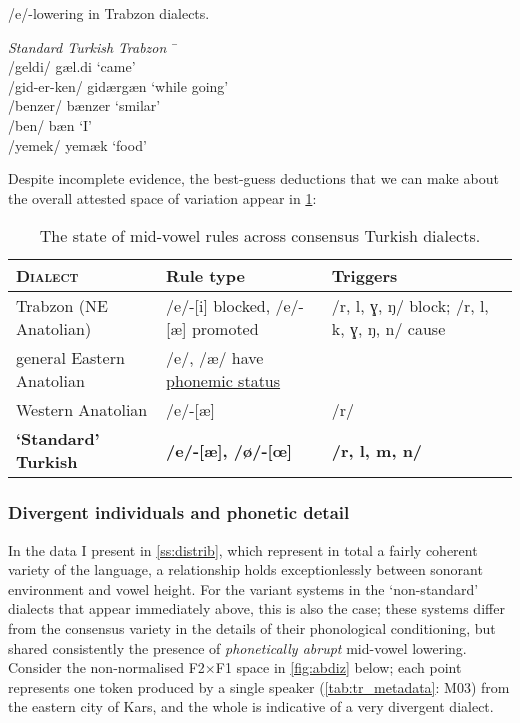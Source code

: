 \begin{example}\label{ex:trabzon2} /e/-lowering in Trabzon dialects.
\begin{tabbing}
  \textit{Standard Turkish} \tab[2cm] \= \textit{Trabzon} \tab[2cm] \= \ \\
  /geldi/ \> gæl.di \> `came'\\
  /gid-er-ken/ \> gidærgæn \> `while going' \\
  /benzer/ \> bænzer \> `smilar' \\
  /ben/ \> bæn \> `I'\\
  /yemek/ \> yemæk  \> `food'
\end{tabbing}
\end{example}


Despite incomplete evidence, the best-guess deductions that we can make about the overall attested space of variation appear in \cref{tab:tr_dialects}:

\begin{table}[H]
\centering
  \begin{adjustbox}{width=\linewidth}
\begin{tabular}{lll}
  \toprule
\textsc{Dialect} & Rule type & Triggers \\
\midrule
Trabzon (NE Anatolian) & /e/-[i] blocked, /e/-[æ] promoted & /r, l, ɣ, ŋ/ block; /r, l, k, ɣ, ŋ, n/ cause \\
general Eastern Anatolian & /e/, /æ/ have \underline{phonemic status} \\
Western Anatolian & /e/-[æ] & /r/  \\
\textbf{`Standard' Turkish} &\textbf{ /e/-[æ], /ø/-[œ]} & \textbf{/r, l, m, n/}\\
\bottomrule
\end{tabular}
\end{adjustbox}
\caption{The state of mid-vowel rules across consensus Turkish dialects.}
\label{tab:tr_dialects}
\end{table}

\subsubsection{Divergent individuals and phonetic detail}\label{sss:abdiz}

In the data I present in \cref{ss:distrib}, which represent in total a fairly coherent variety of the language, a relationship holds exceptionlessly between sonorant environment and vowel height. For the variant systems in the `non-standard' dialects that appear immediately above, this is also the case; these systems differ from the consensus variety in the details of their phonological conditioning, but shared consistently the presence of \emph{phonetically abrupt} mid-vowel lowering. Consider the non-normalised F2$\times$F1 space in \cref{fig:abdiz} below; each point represents one token produced by a single speaker (\cref{tab:tr_metadata}: M03) from the eastern city of Kars, and the whole is indicative of a very divergent dialect.

